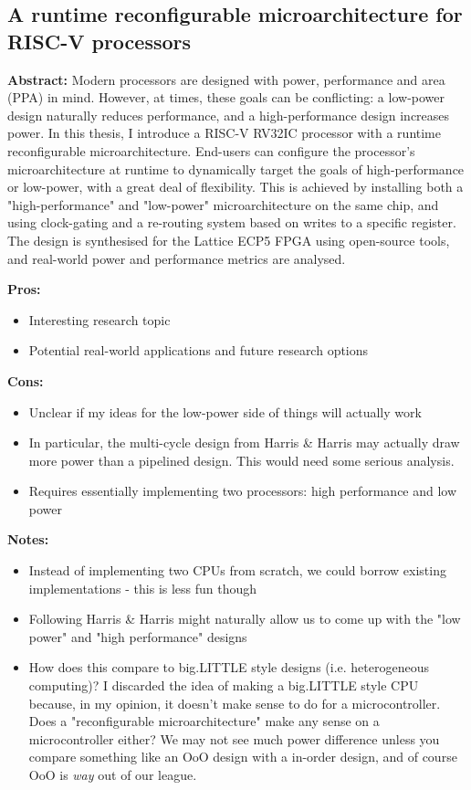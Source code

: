 \documentclass[12pt]{article}
\begin{document}
\subsection{A runtime reconfigurable microarchitecture for RISC-V processors}
\textbf{Abstract:} Modern processors are designed with power, performance and area (PPA) in mind.
However, at times, these goals can be conflicting: a low-power design naturally reduces performance, and
a high-performance design increases power. In this thesis, I introduce a RISC-V RV32IC processor with a
runtime reconfigurable microarchitecture. End-users can configure the processor's microarchitecture at
runtime to dynamically target the goals of high-performance or low-power, with a great deal of flexibility. 
This is achieved by installing both a "high-performance" and "low-power" microarchitecture on the same
chip, and using clock-gating and a re-routing system based on writes to a specific register.
The design is synthesised for the Lattice ECP5 FPGA using open-source tools, and real-world power and 
performance metrics are analysed.

\textbf{Pros:}

\begin{itemize}
    \item Interesting research topic
    \item Potential real-world applications and future research options
\end{itemize}

\textbf{Cons:}

\begin{itemize}
    \item Unclear if my ideas for the low-power side of things will actually work
    \item In particular, the multi-cycle design from Harris \& Harris may actually draw more power than a
	pipelined design. This would need some serious analysis.
    \item Requires essentially implementing two processors: high performance and low power
\end{itemize}

\textbf{Notes:}

\begin{itemize}
    \item Instead of implementing two CPUs from scratch, we could borrow existing implementations - this is
	less fun though
    \item Following Harris \& Harris might naturally allow us to come up with the "low power" and "high performance"
	designs
    \item How does this compare to big.LITTLE style designs (i.e. heterogeneous computing)? I
	discarded the idea of making a big.LITTLE style CPU because, in my opinion, it doesn't make sense to
	do for a microcontroller. Does a "reconfigurable microarchitecture" make any sense on a
	microcontroller either? We may not see much power difference unless you compare something like an OoO
	design with a in-order design, and of course OoO is \textit{way} out of our league.
\end{itemize}
\end{document}
